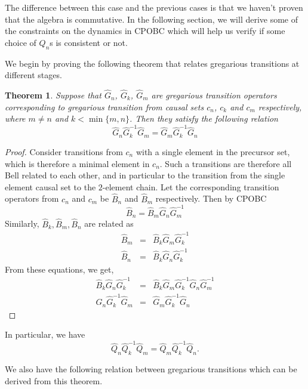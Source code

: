 \documentclass[11pt]{article}
\newtheorem{theorem}{Theorem}[section]
\newcommand{\h}{\hat}
\begin{document}
The difference between this case and the previous cases is that we haven't proven that the algebra is commutative. In the following section, we will derive some of the constraints on the dynamics in CPOBC which will help us verify if some choice of $Q_n$s is consistent or not. 

We begin by proving the following theorem that relates gregarious transitions at different stages. 
\begin{theorem}
Suppose that $\h G_n$, $\h G_k$, $\h G_m$ are gregarious transition operators corresponding to gregarious transition from causal sets $c_n$, $c_k$ and $c_m$ respectively, where $m\neq n$ and $k<\min \{m,n\}$. Then they satisfy the following relation
\begin{equation}\label{GTC3.eq}
\h G_n\h G_k^{-1}\h G_m=\h G_m\h G_k^{-1}\h G_n
\end{equation}
\end{theorem}
\begin{proof}
Consider transitions from $c_n$ with a single 
element in the precursor set, which is therefore a minimal element in
$c_n$.  Such a transitions  are therefore all  Bell related to each
other, and in particular to the transition from the
single element causal set to the $2$-element chain.  Let 
the corresponding transition operators from $c_n$ and $c_m$ be $\h
B_n$ and $\h B_m$ respectively. Then by CPOBC 
 \begin{equation}
 \h B_n=\h B_m\h G_n\h G_m^{-1}
 \end{equation}
 Similarly, $\h B_k,\h B_m, \h B_n$ are related as 
 \begin{eqnarray}
\h B_m&=&\h B_k\h G_m\h G_k^{-1}\\
 \h B_n&=&\h B_k\h G_n\h G_k^{-1}
 \end{eqnarray}
 From these equations, we get,
\begin{eqnarray}
\h B_k\h G_n\h G_k^{-1}&=&\h B_k\h G_m\h G_k^{-1}\h G_n\h G_m^{-1}\\
\h G_n\h G_k^{-1}\h G_m&=&\h G_m\h G_k^{-1}\h G_n \label{gregrels.eq}
\end{eqnarray}
\end{proof}
In particular, we have
\begin{equation}
\h Q_n\h Q_k^{-1}\h Q_m=\h Q_m\h Q_k^{-1}\h Q_n.
\end{equation}

We also have the following relation between gregarious transitions which can be derived from this theorem.
\end{document}
